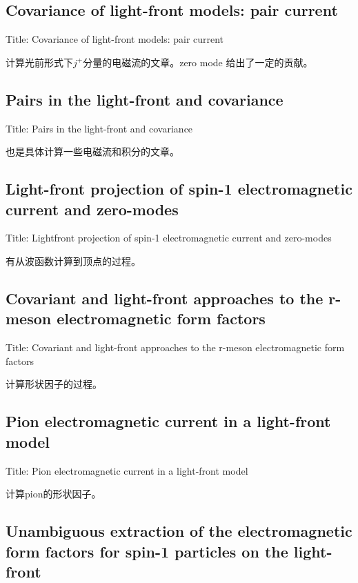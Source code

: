 \documentclass{article}
\begin{document}
\subsection{Covariance of light-front models: pair current}

Title: \quad Covariance of light-front models: pair current \cite{de_Melo_1999}

计算光前形式下$j^+$分量的电磁流的文章。zero mode 给出了一定的贡献。

\subsection{Pairs in the light-front and covariance}

Title: \quad Pairs in the light-front and covariance \cite{de_Melo_1998}

也是具体计算一些电磁流和积分的文章。


\subsection{Light-front projection of spin-1 electromagnetic current and zero-modes}

Title: \quad Lightfront projection of spin-1 electromagnetic current and zero-modes \cite{de_Melo_2012}

有从波函数计算到顶点的过程。 

\subsection{Covariant and light-front approaches to the r-meson electromagnetic form factors} 

Title: \quad Covariant and light-front approaches to the r-meson electromagnetic form factors \cite{de_Melo_1997} 

计算形状因子的过程。


\subsection{Pion electromagnetic current in a light-front model}


Title: \quad Pion electromagnetic current in a light-front model \cite{PhysRevC.59.2278}

计算pion的形状因子。 

\subsection{Unambiguous extraction of the electromagnetic form factors for spin-1
particles on the light-front}
\end{document}
